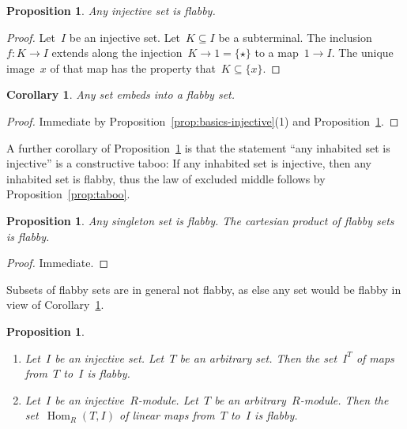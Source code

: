 \documentclass[oneside]{amsart}
\theoremstyle{definition}
\theoremstyle{plain}
\newtheorem{prop}[defn]{Proposition}
\newtheorem{cor}[defn]{Corollary}
\theoremstyle{remark}
\DeclareMathOperator{\Hom}{Hom}
\renewcommand{\_}{\mathpunct{.}\,}
\begin{document}
\begin{prop}\label{prop:injective-flabby}
Any injective set is flabby.\end{prop}

\begin{proof}Let~$I$ be an injective set. Let~$K \subseteq I$ be a subterminal.
The inclusion~$f : K \to I$ extends along the injection~$K \to 1 = \{\star\}$
to a map~$1 \to I$. The unique image~$x$ of that map has the property that~$K
\subseteq \{x\}$.\end{proof}

\begin{cor}\label{cor:enough-flabby-sets}
Any set embeds into a flabby set.\end{cor}

\begin{proof}Immediate by Proposition~\ref{prop:basics-injective}(1) and
Proposition~\ref{prop:injective-flabby}.\end{proof}

A further corollary of Proposition~\ref{prop:injective-flabby} is that the
statement ``any inhabited set is injective'' is a constructive taboo: If any
inhabited set is injective, then any inhabited set is flabby, thus the law of
excluded middle follows by Proposition~\ref{prop:taboo}.

\begin{prop}Any singleton set is flabby. The cartesian product of flabby sets
is flabby.\end{prop}

\begin{proof}Immediate.\end{proof}

Subsets of flabby sets are in general not flabby, as else any set would be
flabby in view of Corollary~\ref{cor:enough-flabby-sets}.

\begin{prop}\label{prop:hom-flabby}
\begin{enumerate}
\item Let~$I$ be an injective set. Let~$T$ be an arbitrary set. Then the
set~$I^T$ of maps from~$T$ to~$I$ is flabby.
\item Let~$I$ be an injective~$R$-module. Let~$T$ be an arbitrary~$R$-module. Then the
set~$\Hom_R(T,I)$ of linear maps from~$T$ to~$I$ is flabby.
\end{enumerate}\end{prop}
\end{document}
